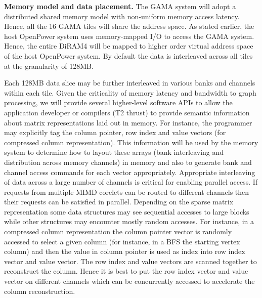 \vspace{3pt}
\noindent
\textbf{Memory model and data placement.} 
The GAMA system will adopt a distributed shared memory model with non-uniform memory access latency. 
Hence, all the 16 GAMA tiles will share the address space. %
As stated earlier, the host OpenPower system uses memory-mapped I/O to access the GAMA system. 
Hence, the entire DiRAM4 will be mapped to higher order virtual address space of the host OpenPower system. 
By default the data is interleaved across all tiles at the granularity of 128MB. 


Each 128MB data slice may be further interleaved in various banks and channels within each tile.  
Given the criticality of memory latency and bandwidth to graph processing, we will provide several higher-level software APIs to allow the application developer or compilers (T2 thrust) to provide semantic information about matrix representations laid out in memory. 
For instance, the programmer may explicitly tag the column pointer, row index and value vectors (for compressed column representation). 
This information will be used by the memory system to determine how to layout these arrays (bank interleaving and distribution across memory channels) in memory and also to generate bank and channel access commands for each vector appropriately. 
Appropriate interleaving of data across a large number of channels is critical for enabling parallel access. 
If requests from multiple MIMD corelets can be routed to different channels then their requests can be satisfied in parallel. 
Depending on the sparse matrix representation some data structures may see sequential accesses to large blocks while other structures may encounter mostly random accesses. For instance, in a compressed column  representation the column pointer vector is randomly accessed to select a given column (for instance, in a BFS the starting vertex column) and then the value in column pointer is used as index into row index  vector and value vector. The row index and value vectors are scanned together to reconstruct the column. Hence it is best to put the row index vector and value vector on different channels which can be concurrently accessed to accelerate the column reconstruction.  


